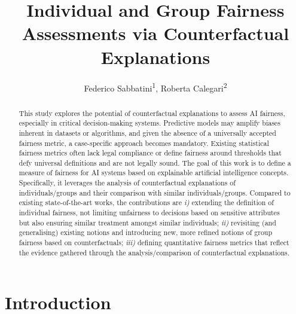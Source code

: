 \documentclass[letterpaper]{article} %
\title{Individual and Group Fairness Assessments via Counterfactual Explanations}
\author{
    Federico Sabbatini\textsuperscript{\rm 1}, Roberta Calegari\textsuperscript{\rm 2}
}
\begin{document}
\maketitle

\begin{abstract}
This study explores the potential of counterfactual explanations to assess AI fairness, especially in critical decision-making systems. Predictive models may amplify biases inherent in datasets or algorithms, and given the absence of a universally accepted fairness metric, a case-specific approach becomes mandatory. 
%
Existing statistical fairness metrics often lack legal compliance or define fairness around thresholds that defy universal definitions and are not legally sound.
%
The goal of this work is to define a measure of fairness for AI systems based on explainable artificial intelligence concepts. Specifically, it leverages the analysis of counterfactual explanations of individuals/groups and their comparison with similar individuals/groups. Compared to existing state-of-the-art works, the contributions are \textit{i)} extending the definition of individual fairness, not limiting unfairness to decisions based on sensitive attributes but also ensuring similar treatment amongst similar individuals; \textit{ii)} revisiting (and generalising) existing notions and introducing new, more refined notions of group fairness based on counterfactuals; \textit{iii)} defining quantitative fairness metrics that reflect the evidence gathered through the analysis/comparison of counterfactual explanations.
\end{abstract}

%

\section{Introduction}\label{sec:introduction}
\end{document}
